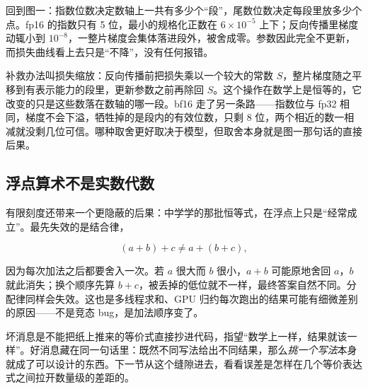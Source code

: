 回到图一：指数位数决定数轴上一共有多少个``段''，尾数位数决定每段里放多少个点。fp16 的指数只有 5 位，最小的规格化正数在 \(6\times10^{-5}\) 上下；反向传播里梯度动辄小到 \(10^{-8}\)，一整片梯度会集体落进段外，被舍成零。参数因此完全不更新，而损失曲线看上去只是``不降''，没有任何报错。

补救办法叫损失缩放：反向传播前把损失乘以一个较大的常数 \(S\)，整片梯度随之平移到有表示能力的段里，更新参数之前再除回 \(S\)。这个操作在数学上是恒等的，它改变的只是这些数落在数轴的哪一段。bf16 走了另一条路——指数位与 fp32 相同，梯度不会下溢，牺牲掉的是段内的有效位数，只剩 8 位，两个相近的数一相减就没剩几位可信。哪种取舍更好取决于模型，但取舍本身就是图一那句话的直接后果。

\subsection{浮点算术不是实数代数}

有限刻度还带来一个更隐蔽的后果：中学学的那批恒等式，在浮点上只是``经常成立''。最先失效的是结合律，

\[
(a+b)+c\ne a+(b+c),
\]

因为每次加法之后都要舍入一次。若 \(a\) 很大而 \(b\) 很小，\(a+b\) 可能原地舍回 \(a\)，\(b\) 就此消失；换个顺序先算 \(b+c\)，被丢掉的低位就不一样，最终答案自然不同。分配律同样会失效。这也是多线程求和、GPU 归约每次跑出的结果可能有细微差别的原因——不是竞态 bug，是加法顺序变了。

坏消息是不能把纸上推来的等价式直接抄进代码，指望``数学上一样，结果就该一样''。好消息藏在同一句话里：既然不同写法给出不同结果，那么\emph{挑一个写法}本身就成了可以设计的东西。下一节从这个缝隙进去，看看误差是怎样在几个等价表达式之间拉开数量级的差距的。
